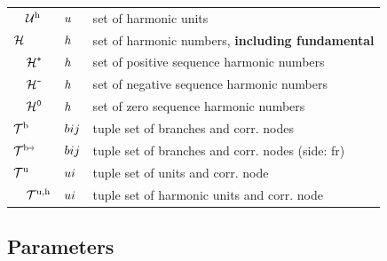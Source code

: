 \documentclass[journal]{IEEEtran}
\begin{document}
\begin{table}[H]
\begin{tabular}{l l l }
        $\quad \mathcal{U}^{\text{h}}$                & $u$       & set of harmonic units                                     \\   
        $\mathcal{H}$                          & $h$   & set of harmonic numbers, \textbf{including fundamental}   \\ 
        $\quad \mathcal{H}^{\texttt{+}}$            & $h$   & set of positive sequence harmonic numbers                 \\ 
        $\quad \mathcal{H}^{\texttt{-}}$            & $h$   & set of negative sequence harmonic numbers                 \\ 
        $\quad \mathcal{H}^{\texttt{0}}$                & $h$   & set of zero sequence harmonic numbers                     \\ \hline
        $\mathcal{T}^{\text{b}}$                         & $bij$  & tuple set of branches and corr. nodes                     \\ 
        $\LineTupleSetFr$                       & $bij$  & tuple set of branches and corr. nodes (side: fr)          \\
        $\mathcal{T}^{\text{u}}$                         & $ui$  & tuple set of units and corr. node                         \\
        $\quad \mathcal{T}^{\text{u,h}}$           & $ui$  & tuple set of harmonic units and corr. node                \\
    \end{tabular}
\end{table}

\subsection{Parameters}
\end{document}
